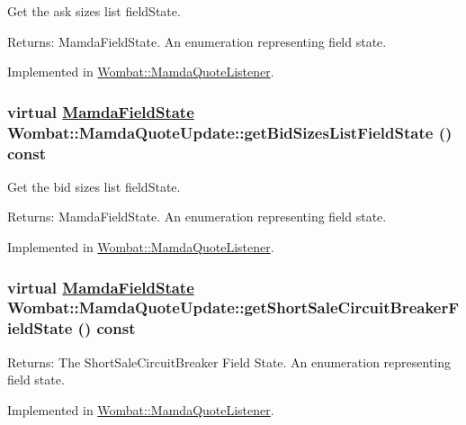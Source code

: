 Get the ask sizes list field\-State. 

\begin{Desc}
\item[Returns:]Mamda\-Field\-State. An enumeration representing field state. \end{Desc}


Implemented in \hyperlink{classWombat_1_1MamdaQuoteListener_b943a6dc805ddb2d213d60539538d290}{Wombat::Mamda\-Quote\-Listener}.\hypertarget{classWombat_1_1MamdaQuoteUpdate_83ee33d86911c4f6f6929cf9ccc037e8}{
\subsubsection[getBidSizesListFieldState]{\setlength{\rightskip}{0pt plus 5cm}virtual \hyperlink{namespaceWombat_93aac974f2ab713554fd12a1fa3b7d2a}{Mamda\-Field\-State} Wombat::Mamda\-Quote\-Update::get\-Bid\-Sizes\-List\-Field\-State () const}}
\label{classWombat_1_1MamdaQuoteUpdate_83ee33d86911c4f6f6929cf9ccc037e8}


Get the bid sizes list field\-State. 

\begin{Desc}
\item[Returns:]Mamda\-Field\-State. An enumeration representing field state. \end{Desc}


Implemented in \hyperlink{classWombat_1_1MamdaQuoteListener_1b8e1f6e95a20180b0f69df8fb9fdced}{Wombat::Mamda\-Quote\-Listener}.\hypertarget{classWombat_1_1MamdaQuoteUpdate_4b40a925f7415ba6b9fab17a092465e1}{
\subsubsection[getShortSaleCircuitBreakerFieldState]{\setlength{\rightskip}{0pt plus 5cm}virtual \hyperlink{namespaceWombat_93aac974f2ab713554fd12a1fa3b7d2a}{Mamda\-Field\-State} Wombat::Mamda\-Quote\-Update::get\-Short\-Sale\-Circuit\-Breaker\-Field\-State () const}}
\label{classWombat_1_1MamdaQuoteUpdate_4b40a925f7415ba6b9fab17a092465e1}


\begin{Desc}
\item[Returns:]The Short\-Sale\-Circuit\-Breaker Field State. An enumeration representing field state. \end{Desc}


Implemented in \hyperlink{classWombat_1_1MamdaQuoteListener_741a0cdce0ceb5247ec54a883b265374}{Wombat::Mamda\-Quote\-Listener}.